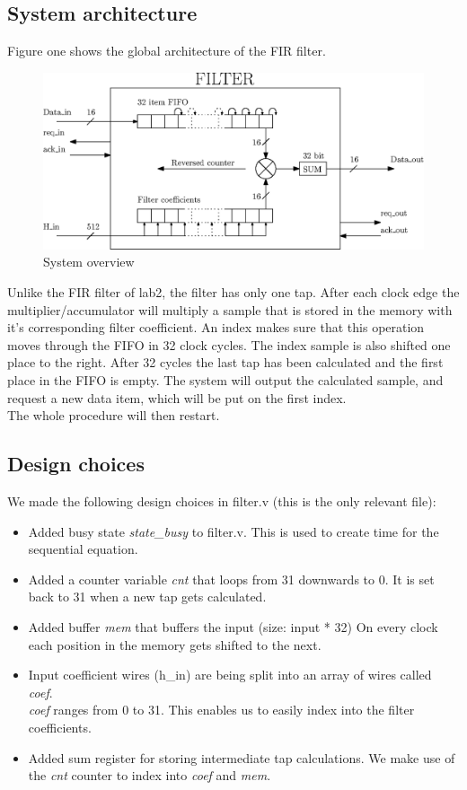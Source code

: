 \documentclass[a4paper,twoside,11pt, fleqn]{article}
\begin{document}
\subsection{System architecture}
Figure one shows the global architecture of the FIR filter. 
\begin{figure}[h]
	\includegraphics[scale = 1]{Images/3a_blockdiagram}
    \caption{System overview}
\end{figure}

Unlike the FIR filter of lab2, the filter has only one tap. After each clock edge the multiplier/accumulator will multiply a sample that is stored in the memory with it's corresponding filter coefficient. An index makes sure that this operation moves through the FIFO in 32 clock cycles. The index sample is also shifted one place to the right. After 32 cycles the last tap has  been calculated and the first place in the FIFO is empty. The system will output the calculated sample, and request a new data item, which will be put on the first index.\\ 

The whole procedure will then restart.
\subsection{Design choices}
We made the following design choices in filter.v (this is the only relevant file):
\begin{itemize}
	\item Added busy state \textit{state\_busy} to filter.v.
		\subitem This is used to create time for the sequential equation. 
	\item Added a counter variable \textit{cnt} that loops from 31 downwards to 0. It is set back to 31 when a new tap gets calculated.
	\item Added buffer \textit{mem} that buffers the input (size: input * 32)
		\subitem On every clock each position in the memory gets shifted to the next.
	\item Input coefficient wires (h\_in) are being split into an array of wires called \textit{coef}. \\ \textit{coef} ranges from 0 to 31.
		\subitem This enables us to easily index into the filter coefficients.
	\item Added sum register for storing intermediate tap calculations.
		\subitem We make use of the \textit{cnt} counter to index into \textit{coef} and \textit{mem}.
\end{itemize}
\end{document}
